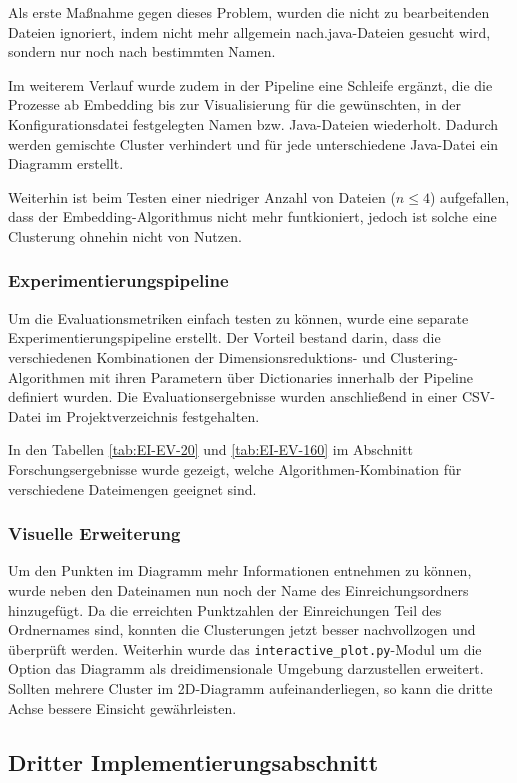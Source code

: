 Als erste Maßnahme gegen dieses Problem, wurden die nicht zu bearbeitenden Dateien ignoriert, indem nicht mehr allgemein nach.java-Dateien gesucht wird, sondern nur noch nach bestimmten Namen. 

Im weiterem Verlauf wurde zudem in der Pipeline eine Schleife ergänzt, die die Prozesse ab Embedding bis zur Visualisierung für die gewünschten, in der Konfigurationsdatei festgelegten Namen bzw. Java-Dateien wiederholt. Dadurch werden gemischte Cluster verhindert und für jede unterschiedene Java-Datei ein Diagramm erstellt.

Weiterhin ist beim Testen einer niedriger Anzahl von Dateien (\(n \leq 4\)) aufgefallen, dass der Embedding-Algorithmus nicht mehr funtkioniert, jedoch ist solche eine Clusterung ohnehin nicht von Nutzen.


\subsubsection*{Experimentierungspipeline}
Um die Evaluationsmetriken einfach testen zu können, wurde eine separate Experimentierungspipeline erstellt. Der Vorteil bestand darin, dass die verschiedenen Kombinationen der Dimensionsreduktions- und Clustering-Algorithmen mit ihren Parametern über Dictionaries innerhalb der Pipeline definiert wurden. Die Evaluationsergebnisse wurden anschließend in einer CSV-Datei im Projektverzeichnis festgehalten.

In den Tabellen \ref{tab:EI-EV-20} und \ref{tab:EI-EV-160} im Abschnitt Forschungsergebnisse wurde gezeigt, welche Algorithmen-Kombination für verschiedene Dateimengen geeignet sind.


\subsubsection*{Visuelle Erweiterung}
Um den Punkten im Diagramm mehr Informationen entnehmen zu können, wurde neben den Dateinamen nun noch der Name des Einreichungsordners hinzugefügt. Da die erreichten Punktzahlen der Einreichungen Teil des Ordnernames sind, konnten die Clusterungen jetzt besser nachvollzogen und überprüft werden. Weiterhin wurde das \texttt{interactive\_plot.py}-Modul um die Option das Diagramm als dreidimensionale Umgebung darzustellen erweitert. Sollten mehrere Cluster im 2D-Diagramm aufeinanderliegen, so kann die dritte Achse bessere Einsicht gewährleisten.


\subsection{Dritter Implementierungsabschnitt}
